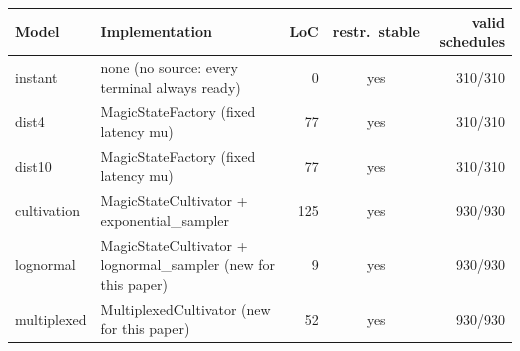 \begin{tabular}{llrcr}
\toprule
Model & Implementation & LoC & restr.\ stable & valid schedules \\
\midrule
instant & none (no source: every terminal always ready) & 0 & yes & 310/310 \\
dist4 & MagicStateFactory (fixed latency mu) & 77 & yes & 310/310 \\
dist10 & MagicStateFactory (fixed latency mu) & 77 & yes & 310/310 \\
cultivation & MagicStateCultivator + exponential_sampler & 125 & yes & 930/930 \\
lognormal & MagicStateCultivator + lognormal_sampler (new for this paper) & 9 & yes & 930/930 \\
multiplexed & MultiplexedCultivator (new for this paper) & 52 & yes & 930/930 \\
\bottomrule
\end{tabular}
